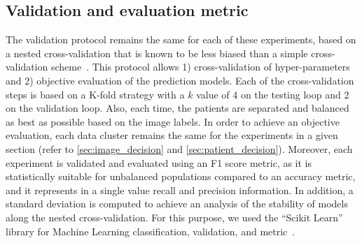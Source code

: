 \documentclass[journal,article,submit,moreauthors,pdftex, applsci]{Definitions/mdpi}
\begin{document}
\subsection{Validation and evaluation metric}
The validation protocol remains the same for each of these experiments, based on a nested cross-validation that is known to be less biased than a simple cross-validation scheme~\cite{Cawley2010}. This protocol allows 1) cross-validation of hyper-parameters and 2) objective evaluation of the prediction models. Each of the cross-validation steps is based on a K-fold strategy with a $k$ value of 4 on the testing loop and 2 on the validation loop. Also, each time, the patients are separated and balanced as best as possible based on the image labels. In order to achieve an objective evaluation, each data cluster remains the same for the experiments in a given section (refer to \cref{sec:image_decision} and \cref{sec:patient_decision}). Moreover, each experiment is validated and evaluated using an F1 score metric, as it is statistically suitable for unbalanced populations compared to an accuracy metric, and it represents in a single value recall and precision information. In addition, a standard deviation is computed to achieve an analysis of the stability of models along the nested cross-validation. For this purpose, we used the “Scikit Learn” library for Machine Learning classification, validation, and metric~\cite{pedregosa2011scikit}.\par
\end{document}
